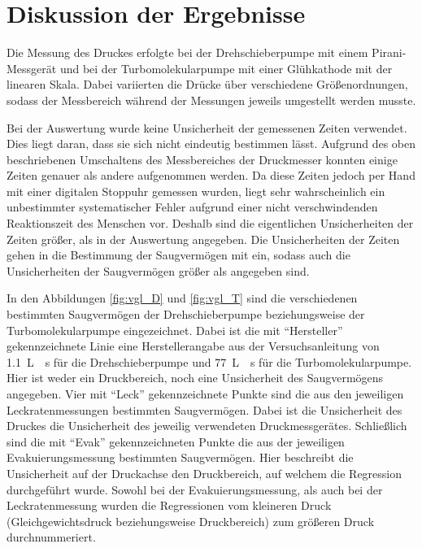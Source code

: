 \section{Diskussion der Ergebnisse}
\label{sec:Diskussion}

Die Messung des Druckes erfolgte bei der Drehschieberpumpe mit einem
Pirani-Messgerät und bei der Turbomolekularpumpe mit einer Glühkathode mit der
linearen Skala. Dabei variierten die Drücke über verschiedene Größenordnungen,
sodass der Messbereich während der Messungen jeweils umgestellt werden musste.

Bei der Auswertung wurde keine Unsicherheit der gemessenen Zeiten verwendet.
Dies liegt daran, dass sie sich nicht eindeutig bestimmen lässt.
Aufgrund des oben beschriebenen Umschaltens des Messbereiches der Druckmesser konnten
einige Zeiten genauer als andere aufgenommen werden.
Da diese Zeiten jedoch per Hand mit einer digitalen Stoppuhr gemessen wurden,
liegt sehr wahrscheinlich ein unbestimmter systematischer Fehler aufgrund einer
nicht verschwindenden Reaktionszeit des Menschen vor.
Deshalb sind die eigentlichen Unsicherheiten der Zeiten größer,
als in der Auswertung angegeben.
Die Unsicherheiten der Zeiten gehen in die Bestimmung der Saugvermögen mit ein,
sodass auch die Unsicherheiten der Saugvermögen größer als angegeben sind.

In den Abbildungen \ref{fig:vgl_D} und \ref{fig:vgl_T} sind die verschiedenen
bestimmten Saugvermögen der Drehschieberpumpe beziehungsweise der
Turbomolekularpumpe eingezeichnet.
Dabei ist die mit \enquote{Hersteller} gekennzeichnete Linie eine Herstellerangabe
aus der Versuchsanleitung \cite{anleitung} von \SI{1.1}{\liter{}\second}
für die Drehschieberpumpe und \SI{77}{\liter{}\second} für die
Turbomolekularpumpe. Hier ist weder ein Druckbereich, noch eine Unsicherheit des
Saugvermögens angegeben.
Vier mit \enquote{Leck} gekennzeichnete Punkte sind die aus den jeweiligen
Leckratenmessungen bestimmten Saugvermögen. Dabei ist die Unsicherheit des
Druckes die Unsicherheit des jeweilig verwendeten Druckmessgerätes.
Schließlich sind die mit \enquote{Evak} gekennzeichneten Punkte die aus der
jeweiligen Evakuierungsmessung bestimmten Saugvermögen. Hier beschreibt die
Unsicherheit auf der Druckachse den Druckbereich, auf welchem die Regression
durchgeführt wurde.
Sowohl bei der Evakuierungsmessung, als auch bei der Leckratenmessung wurden die
Regressionen vom kleineren Druck (Gleichgewichtsdruck beziehungsweise Druckbereich)
zum größeren Druck durchnummeriert.

